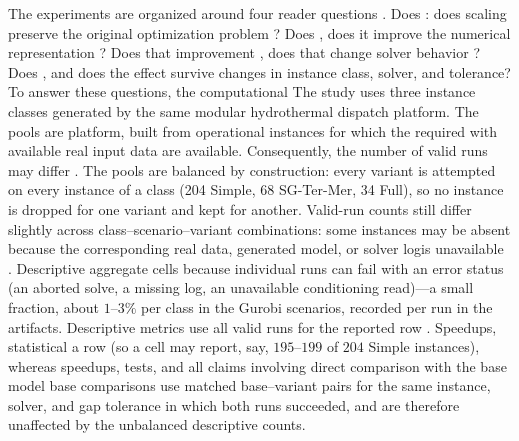 \documentclass[AMA,Times1COL]{WileyNJDv5} %
\providecommand{\DIFadd}[1]{{\protect\color{blue} \sf #1}} %
\providecommand{\DIFdel}[1]{{\protect\color{red} \scriptsize #1}} %
\providecommand{\DIFaddbegin}{} %
\providecommand{\DIFaddend}{} %
\providecommand{\DIFdelbegin}{} %
\providecommand{\DIFdelend}{} %
\begin{document}
The experiments are organized around four reader questions\DIFdelbegin \DIFdel{. Does }\DIFdelend \DIFaddbegin \DIFadd{: does }\DIFaddend scaling preserve the original
optimization problem\DIFdelbegin \DIFdel{? Does }\DIFdelend \DIFaddbegin \DIFadd{, does }\DIFaddend it improve the numerical representation\DIFdelbegin \DIFdel{? Does that improvement }\DIFdelend \DIFaddbegin \DIFadd{, does that }\DIFaddend change solver
behavior\DIFdelbegin \DIFdel{? Does }\DIFdelend \DIFaddbegin \DIFadd{, and does }\DIFaddend the effect survive changes in \DIFdelbegin \DIFdel{instance }\DIFdelend class, solver, and tolerance? \DIFdelbegin \DIFdel{To answer these questions, the computational }\DIFdelend \DIFaddbegin \DIFadd{The }\DIFaddend study uses
three instance classes generated by the same modular hydrothermal \DIFdelbegin \DIFdel{dispatch platform. The pools are }\DIFdelend \DIFaddbegin \DIFadd{platform, }\DIFaddend built from
operational instances \DIFdelbegin \DIFdel{for which the required }\DIFdelend \DIFaddbegin \DIFadd{with available }\DIFaddend real input data\DIFdelbegin \DIFdel{are available. Consequently, the number
of valid runs may differ
}\DIFdelend \DIFaddbegin \DIFadd{. The pools are balanced by construction:
every variant is attempted on every instance of a class (204 Simple, 68 SG-Ter-Mer, 34 Full), so
no instance is dropped for one variant and kept for another. Valid-run counts still differ
slightly }\DIFaddend across class--scenario--variant \DIFdelbegin \DIFdel{combinations: some instances may be absent because the
corresponding real data, generated model, or solver logis unavailable . Descriptive
aggregate }\DIFdelend \DIFaddbegin \DIFadd{cells because individual runs can fail with an error
status (an aborted solve, a missing log, an unavailable conditioning read)---a small fraction,
about $1$--$3\%$ per class in the Gurobi scenarios, recorded per run in the artifacts. Descriptive
}\DIFaddend metrics use all valid runs for \DIFdelbegin \DIFdel{the reported row . Speedups, statistical }\DIFdelend \DIFaddbegin \DIFadd{a row (so a cell may report, say, $195$--$199$ of $204$ Simple
instances), whereas speedups, }\DIFaddend tests, and all \DIFdelbegin \DIFdel{claims involving direct comparison with the base model }\DIFdelend \DIFaddbegin \DIFadd{base comparisons }\DIFaddend use matched base--variant pairs \DIFdelbegin \DIFdel{for the same instance, solver, and gap tolerance}\DIFdelend \DIFaddbegin \DIFadd{in
which both runs succeeded, and are therefore unaffected by the unbalanced descriptive counts}\DIFaddend .
\end{document}
